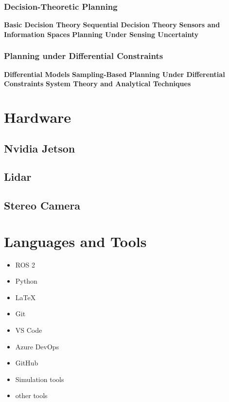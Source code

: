 \subsubsection{Decision-Theoretic Planning}
\textbf{Basic Decision Theory}
\textbf{Sequential Decision Theory}
\textbf{Sensors and Information Spaces}
\textbf{Planning Under Sensing Uncertainty}

\subsubsection{Planning under Differential Constraints}
\textbf{Differential Models}
\textbf{Sampling-Based Planning Under Differential Constraints}
\textbf{System Theory and Analytical Techniques}

\section{Hardware}

\subsection{Nvidia Jetson}
\lipsum[1]

\subsection{Lidar}
\lipsum[1]

\subsection{Stereo Camera}
\lipsum[1]

\section{Languages and Tools}

\begin{itemize}
    \item ROS 2
    \item Python
    \item LaTeX
    \item Git
    \item VS Code
    \item Azure DevOps
    \item GitHub
    \item Simulation tools
    \item other tools
\end{itemize}

\lipsum[1]